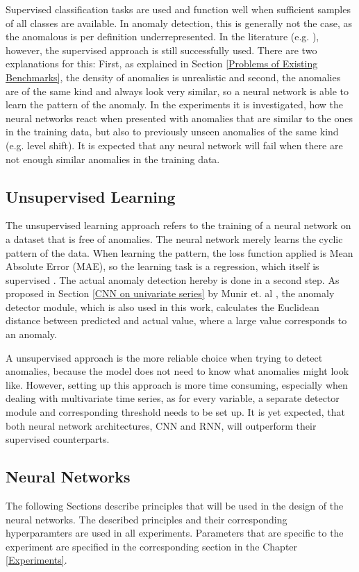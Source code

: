 Supervised classification tasks are used and function well when sufficient samples of all classes are available. In anomaly detection, this is generally not the case, as the anomalous is per definition underrepresented. In the literature (e.g. \parencite{Wen2019}), however, the supervised approach is still successfully used. There are two explanations for this: First, as explained in Section \ref{Problems of Existing Benchmarks}, the density of anomalies is unrealistic and second, the anomalies are of the same kind and always look very similar, so a neural network is able to learn the pattern of the anomaly. In the experiments it is investigated, how the neural networks react when presented with anomalies that are similar to the ones in the training data, but also to previously unseen anomalies of the same kind (e.g. level shift). It is expected that any neural network will fail when there are not enough similar anomalies in the training data.

\subsection{Unsupervised Learning}
The unsupervised learning approach refers to the training of a neural network on a dataset that is free of anomalies. The neural network merely learns the cyclic pattern of the data. When learning the pattern, the loss function applied is Mean Absolute Error (MAE), so the learning task is a regression, which itself is supervised \parencite{Brownlee2019}. The actual anomaly detection hereby is done in a second step. As proposed in Section \ref{CNN on univariate series} by Munir et. al \parencite*{Munir2019}, the anomaly detector module, which is also used in this work, calculates the Euclidean distance between predicted and actual value, where a large value corresponds to an anomaly.

A unsupervised approach is the more reliable choice when trying to detect anomalies, because the model does not need to know what anomalies might look like. However, setting up this approach is more time consuming, especially when dealing with multivariate time series, as for every variable, a separate detector module and corresponding threshold needs to be set up. It is yet expected, that both neural network architectures, CNN and RNN, will outperform their supervised counterparts. 

\subsection{Neural Networks}
The following Sections describe principles that will be used in the design of the neural networks. The described principles and their corresponding hyperparamters are used in all experiments. Parameters that are specific to the experiment are specified in the corresponding section in the Chapter \ref{Experiments}. 

